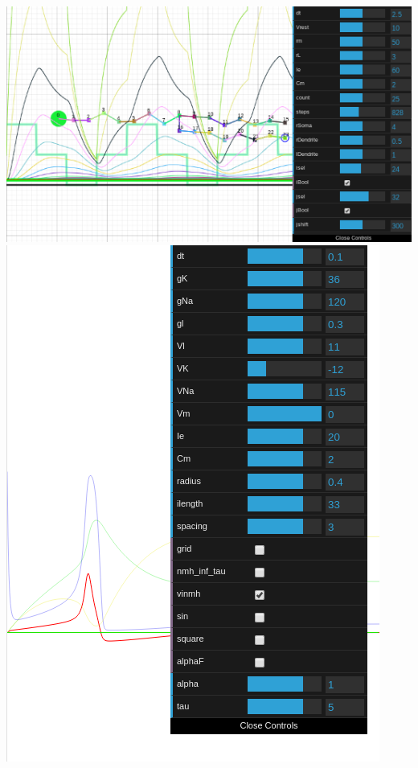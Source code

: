 \documentclass[../resume.tex]{subfiles}
\begin{document}
\href{https://github.com/randompast/multicompartmentalModel}{\includegraphics[scale=0.4]{../scientific/mcm.png}}
\includegraphics[scale=0.2]{../scientific/initial.png} 
\end{document}

